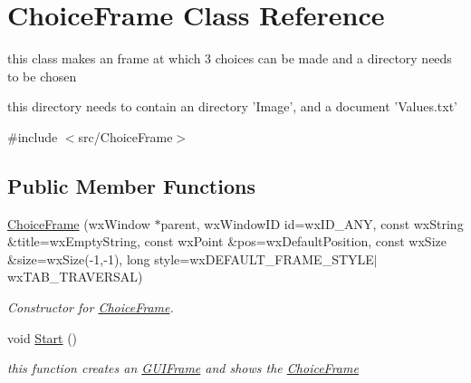 \hypertarget{classChoiceFrame}{
\section{ChoiceFrame Class Reference}
\label{classChoiceFrame}
}


this class makes an frame at which 3 choices can be made and a directory needs to be chosen \par
 this directory needs to contain an directory 'Image', and a document 'Values.txt'  




{\ttfamily \#include $<$src/ChoiceFrame$>$}

\subsection*{Public Member Functions}
\begin{DoxyCompactItemize}
\item 
\hypertarget{classChoiceFrame_a2ac7cbf7bb1cc6d431a97eeaa568f89b}{
\hyperlink{classChoiceFrame_a2ac7cbf7bb1cc6d431a97eeaa568f89b}{ChoiceFrame} (wxWindow $\ast$parent, wxWindowID id=wxID\_\-ANY, const wxString \&title=wxEmptyString, const wxPoint \&pos=wxDefaultPosition, const wxSize \&size=wxSize(-\/1,-\/1), long style=wxDEFAULT\_\-FRAME\_\-STYLE$|$wxTAB\_\-TRAVERSAL)}
\label{classChoiceFrame_a2ac7cbf7bb1cc6d431a97eeaa568f89b}

\begin{DoxyCompactList}\small\item\em Constructor for \hyperlink{classChoiceFrame}{ChoiceFrame}. \item\end{DoxyCompactList}\item 
\hypertarget{classChoiceFrame_aef761d5247438b283d8020e3337048c1}{
void \hyperlink{classChoiceFrame_aef761d5247438b283d8020e3337048c1}{Start} ()}
\label{classChoiceFrame_aef761d5247438b283d8020e3337048c1}

\begin{DoxyCompactList}\small\item\em this function creates an \hyperlink{classGUIFrame}{GUIFrame} and shows the \hyperlink{classChoiceFrame}{ChoiceFrame} \item\end{DoxyCompactList}\end{DoxyCompactItemize}
